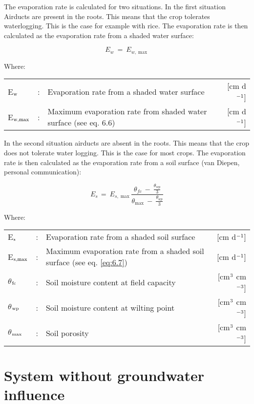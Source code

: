 The evaporation rate is calculated for two situations. In the first situation
Airducts are present in the roots. This means that the crop tolerates waterlogging. This
is the case for example with rice. The evaporation rate is then calculated as the 
evaporation rate from a shaded water surface:

\begin{equation}
E _{w} ~=~ E _{w, \max } 
\end{equation}

Where:\\[5pt]
\begin{tabularx}{\textwidth}{llXr}
    E$_{{\rm w}}$ &:& Evaporation rate from a shaded water surface & [cm d$^{{\rm -1}}$]\\
    E$_{{\rm w,max}}$ &:& Maximum evaporation rate from shaded 
    water surface (see eq. 6.6) & [cm d$^{{\rm -1}}$]\\
\end{tabularx}

In the second situation airducts are absent in the roots. This means that the crop does
not tolerate water
logging. This is the case for most crops. The evaporation rate is then calculated as the
evaporation rate from a soil surface (van Diepen, personal communication):  

\begin{equation}
E _{s~} =~ E _{s,\max } {\frac{ \theta  _{fc} ~-~ {{\frac{\theta  _{wp} }{3}}} }{\theta  _{\max } ~-~{{\frac{\theta  _{wp} }{3}}} }}
\end{equation}

Where:\\[5pt]
\begin{tabularx}{\textwidth}{llXr}
    E$_{{\rm s}}$ &:& Evaporation rate from a shaded soil surface & [cm d$^{{\rm -1}}$]\\
    E$_{{\rm s,max}}$ &:& Maximum evaporation rate from a shaded
    soil surface (see eq. \ref{eq:6.7}) & [cm d$^{{\rm -1}}$]\\
    $\theta$$_{{\rm fc}}$ &:& Soil moisture content at field capacity & [cm$^{{\rm 3}}$ cm$^{{\rm -3}}$]\\
    $\theta$$_{{\rm wp}}$ &:& Soil moisture content at wilting point & [cm$^{{\rm 3}}$ cm$^{{\rm -3}}$]\\
    $\theta$$_{{\rm max}}$ &:& Soil porosity & [cm$^{{\rm 3}}$ cm$^{{\rm -3}}$]\\
\end{tabularx}

\section{System without groundwater influence}
\label{sec:WATFD}

